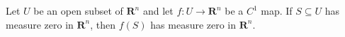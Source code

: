 Let $U$ be an open subset of $\mathbf{R}^n$ and let $f: U \to \mathbf{R}^n$ be a $C^1$ map. If $S \subseteq U$ has measure zero in $\mathbf{R}^n$, then $f(S)$ has measure zero in $\mathbf{R}^n$.
